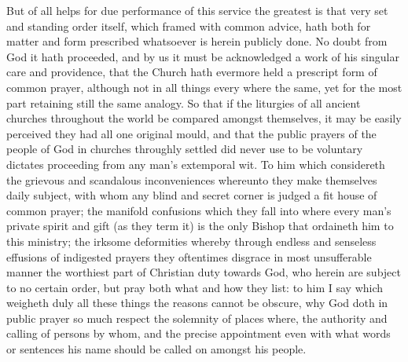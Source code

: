 But of all helps for due performance of this service the greatest is that very set and standing order itself, which framed with common advice, hath both for matter and form prescribed whatsoever is herein publicly done. No doubt from God it hath proceeded, and by us it must be acknowledged a work of his singular care and providence, that the Church hath evermore held a prescript form of common prayer, although not in all things every where the same, yet for the most part retaining still the same analogy. So that if the liturgies of all ancient churches throughout the world be compared amongst themselves, it may be easily perceived they had all one original mould, and that the public prayers of the people of God in churches throughly settled did never use to be voluntary dictates proceeding from any man’s extemporal wit.
To him which considereth the grievous and scandalous inconveniences whereunto they make themselves daily subject, with whom any blind and secret corner is judged a fit house of common prayer; the manifold confusions which they fall into where every man’s private spirit and gift (as they term it) is the only Bishop that ordaineth him to this ministry; the irksome deformities whereby through endless and senseless effusions of indigested prayers they oftentimes disgrace in most unsufferable manner the worthiest part of Christian duty towards God, who herein are subject to no certain order, but pray both what and how they list: to him I say which weigheth duly all these things the reasons cannot be obscure, why God doth in public prayer so much respect the solemnity of places where, the authority and calling of persons by whom, and the precise appointment even with what words or sentences his name should be called on amongst his people.


